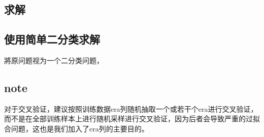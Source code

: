 \documentclass{jmlr}
\begin{document}
\begin{CJK*}{UTF8}{gbsn}
\section{求解}

\subsection{使用简单二分类求解}
將原问题视为一个二分类问题，

\subsection{note}
对于交叉验证，建议按照训练数据era列随机抽取一个或若干个era进行交叉验证，而不是在全部训练样本上进行随机采样进行交叉验证，因为后者会导致严重的过拟合问题，这也是我们加入了era列的主要目的。




\end{CJK*}
\end{document}
